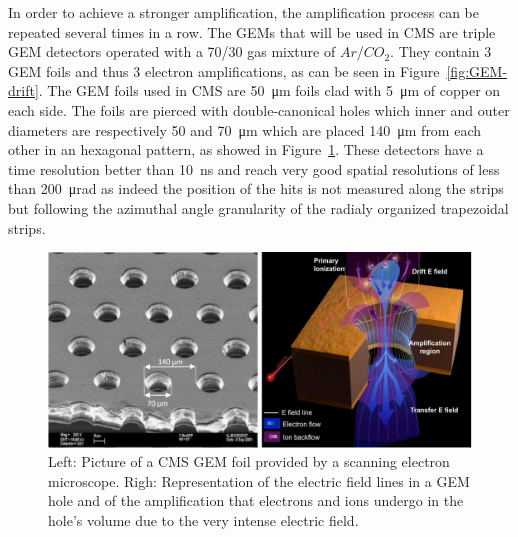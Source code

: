 	In order to achieve a stronger amplification, the amplification process can be repeated several times in a row. The GEMs that will be used in CMS are triple GEM detectors operated with a 70/30 gas mixture of $Ar$/$CO_2$. They contain 3 GEM foils and thus 3 electron amplifications, as can be seen in Figure~\ref{fig:GEM-drift}. The GEM foils used in CMS are \SI{50}{\micro m} foils clad with \SI{5}{\micro m} of copper on each side. The foils are pierced with double-canonical holes which inner and outer diameters are respectively 50 and \SI{70}{\micro m} which are placed \SI{140}{\micro m} from each other in an hexagonal pattern, as showed in Figure~\ref{fig:GEM-foil}. These detectors have a time resolution better than \SI{10}{ns} and reach very good spatial resolutions of less than \SI{200}{\micro rad} as indeed the position of the hits is not measured along the strips but following the azimuthal angle granularity of the radialy organized trapezoidal strips.

	\begin{figure}[H]
		\centering
		\includegraphics[width=\plotwidth]{fig/chapt3/GEM-foil-ampli.png}
		\caption{\label{fig:GEM-foil} Left: Picture of a CMS GEM foil provided by a scanning electron microscope. Righ: Representation of the electric field lines in a GEM hole and of the amplification that electrons and ions undergo in the hole's volume due to the very intense electric field.}
	\end{figure}

